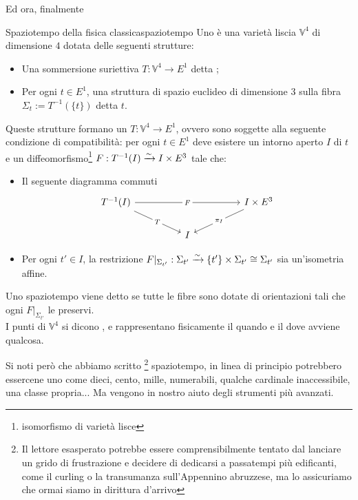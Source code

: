 \documentclass[openany]{book}
\renewcommand\V{\mathbb{V}}
\begin{document}
Ed ora, finalmente

\begin{definition}{Spaziotempo della fisica classica}{spaziotempo}
    Uno  è una varietà liscia $\V^4$ di dimensione $4$ dotata delle seguenti strutture:\begin{itemize}
        \item Una sommersione suriettiva $T:\V^4\to E^1$ detta ;
        \item Per ogni $t \in E^1$, una struttura di spazio euclideo di dimensione $3$ sulla fibra $\Sigma_t := T^{-1}(\{t\})$ detta  $t$.
    \end{itemize} 
    Queste strutture formano un  $T:\V^4\to E^1$, ovvero sono soggette alla seguente condizione di compatibilità: per ogni $t \in E^1$ deve esistere un intorno aperto $I$ di $t$ e un diffeomorfismo\footnote{isomorfismo di varietà lisce} $F: T^{-1}(I)\xrightarrow{\sim} I\times E^3$ tale che:\begin{itemize}
        \item Il seguente diagramma commuti 
            \[\begin{tikzcd}
        	    {T^{-1}(I)} &&&& {I\times E^3} \\
	            && I
	            \arrow["F"{description}, from=1-1, to=1-5]
	            \arrow["T"{description}, from=1-1, to=2-3]
	            \arrow["{\pi_I}"{description}, from=1-5, to=2-3]
            \end{tikzcd}\]
        \item Per ogni $t'\in I$, la restrizione $F|_{\Sigma_{t'}} : \Sigma_{t'}\xrightarrow{\sim} \{t'\}\times\Sigma_{t'}\cong \Sigma_{t'}$ sia un'isometria affine.
    \end{itemize}
    Uno spaziotempo viene detto  se tutte le fibre sono dotate di orientazioni tali che ogni $F|_{\Sigma_{t'}}$ le preservi.\\
    I punti di $\V^4$ si dicono , e rappresentano fisicamente il quando e il dove avviene qualcosa.
\end{definition}

Si noti però che abbiamo scritto \footnote{Il lettore esasperato potrebbe essere comprensibilmente tentato dal lanciare un grido di frustrazione e decidere di dedicarsi a passatempi più edificanti, come il curling o la transumanza sull'Appennino abruzzese, ma lo assicuriamo che ormai siamo in dirittura d'arrivo} spaziotempo, in linea di principio potrebbero essercene uno come dieci, cento, mille, numerabili, qualche cardinale inaccessibile, una classe propria... Ma vengono in nostro aiuto degli strumenti più avanzati.
\end{document}

